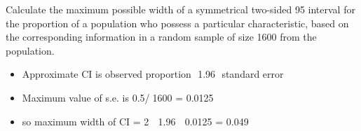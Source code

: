 \documentclass[a4paper,12pt]{article}
\begin{document}
Calculate the maximum possible width of a symmetrical two-sided 95%
interval for the proportion of a population who possess a particular characteristic,
based on the corresponding information in a random sample of size 1600 from the
population. 

\newpage

\begin{itemize}
    \item Approximate CI is observed proportion  {1.96  standard error}
\item Maximum value of s.e. is 0.5/1600 = 0.0125
\item so maximum width of CI = 2  1.96  0.0125 = 0.049
\end{itemize}
\end{document}

